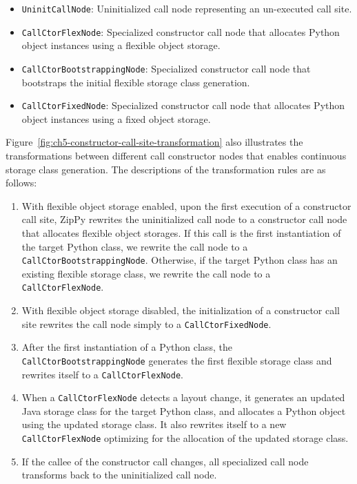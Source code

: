 \begin{itemize}

\item \texttt{UninitCallNode}: Uninitialized call node representing an un-executed call site.

\item \texttt{CallCtorFlexNode}: Specialized constructor call node that allocates Python object instances using a flexible object storage.

\item \texttt{CallCtorBootstrappingNode}: Specialized constructor call node that bootstraps the initial flexible storage class generation.

\item \texttt{CallCtorFixedNode}: Specialized constructor call node that allocates Python object instances using a fixed object storage.

\end{itemize}

Figure~\ref{fig:ch5-constructor-call-site-transformation} also illustrates the transformations between different call constructor nodes that enables continuous storage class generation.
The descriptions of the transformation rules are as follows:

\begin{enumerate}

\item With flexible object storage enabled, upon the first execution of a constructor call site, ZipPy rewrites the uninitialized call node to a constructor call node that allocates flexible object storages.
If this call is the first instantiation of the target Python class, we rewrite the call node to a \texttt{CallCtorBootstrappingNode}.
Otherwise, if the target Python class has an existing flexible storage class, we rewrite the call node to a \texttt{CallCtorFlexNode}.

\item With flexible object storage disabled, the initialization of a constructor call site rewrites the call node simply to a \texttt{CallCtorFixedNode}.

\item After the first instantiation of a Python class, the \texttt{CallCtorBootstrappingNode} generates the first flexible storage class and rewrites itself to a \texttt{CallCtorFlexNode}.

\item When a \texttt{CallCtorFlexNode} detects a layout change, it generates an updated Java storage class for the target Python class, and allocates a Python object using the updated storage class.
It also rewrites itself to a new \texttt{CallCtorFlexNode} optimizing for the allocation of the updated storage class.

\item If the callee of the constructor call changes, all specialized call node transforms back to the uninitialized call node.

\end{enumerate}

